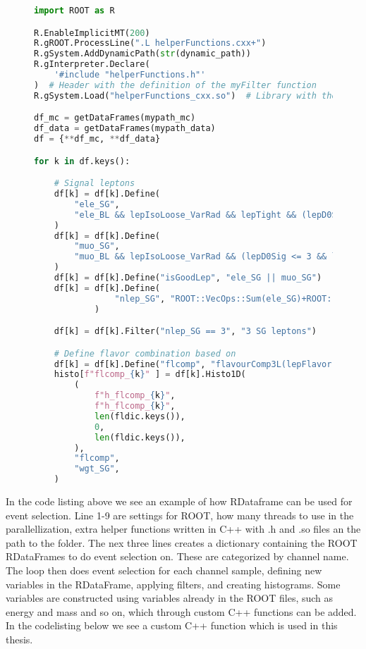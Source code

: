 \begin{figure}
    \centering
\begin{lstlisting}[language=Python, style=pythonstyle, label={code:python_func_example}]
import ROOT as R

R.EnableImplicitMT(200)
R.gROOT.ProcessLine(".L helperFunctions.cxx+")
R.gSystem.AddDynamicPath(str(dynamic_path))
R.gInterpreter.Declare(
    '#include "helperFunctions.h"'
)  # Header with the definition of the myFilter function
R.gSystem.Load("helperFunctions_cxx.so")  # Library with the myFilter function

df_mc = getDataFrames(mypath_mc)
df_data = getDataFrames(mypath_data)
df = {**df_mc, **df_data}

for k in df.keys():

    # Signal leptons
    df[k] = df[k].Define(
        "ele_SG",
        "ele_BL && lepIsoLoose_VarRad && lepTight && (lepD0Sig <= 5 && lepD0Sig >= -5)",
    )  
    df[k] = df[k].Define(
        "muo_SG",
        "muo_BL && lepIsoLoose_VarRad && (lepD0Sig <= 3 && lepD0Sig >= -3)",
    )  
    df[k] = df[k].Define("isGoodLep", "ele_SG || muo_SG")
    df[k] = df[k].Define(
                "nlep_SG", "ROOT::VecOps::Sum(ele_SG)+ROOT::VecOps::Sum(muo_SG)"
            )

    df[k] = df[k].Filter("nlep_SG == 3", "3 SG leptons")

    # Define flavor combination based on 
    df[k] = df[k].Define("flcomp", "flavourComp3L(lepFlavor[ele_SG || muo_SG])")
    histo[f"flcomp_{k}" ] = df[k].Histo1D(
        (
            f"h_flcomp_{k}",
            f"h_flcomp_{k}",
            len(fldic.keys()),
            0,
            len(fldic.keys()),
        ),
        "flcomp",
        "wgt_SG",
    )
    \end{lstlisting}
\end{figure}

In the code listing above we see an example of how RDataframe can be used for event selection. Line 1-9 are settings for ROOT, 
how many threads to use in the parallellization, extra helper functions written in C++ with .h and .so files an the path to the folder.
The nex three lines creates a dictionary containing the ROOT RDataFrames to do event selection on. These are categorized by channel name. 
The loop then does event selection for each channel sample, defining new variables in the RDataFrame, applying filters, and creating histograms.
Some variables are constructed using variables already in the ROOT files, such as energy and mass and so on, which through custom C++ functions
can be added. In the codelisting below we see a custom C++ function which is used in this thesis.

